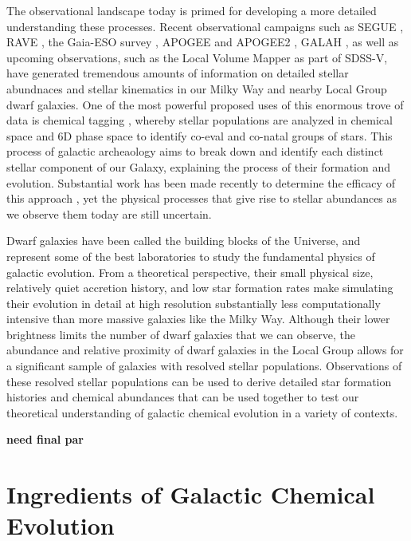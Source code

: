 The observational landscape today is primed for developing a more detailed understanding these processes. Recent observational campaigns such as SEGUE \citep{Yanny2009}, RAVE \citep{Kunder2017}, the Gaia-ESO survey \citep{Gaia}, APOGEE and APOGEE2 \citep{APOGEE2010,APOGEE}, GALAH \citep{GALAH,Buder2018}, as well as upcoming observations, such as the Local Volume Mapper as part of SDSS-V, have generated tremendous amounts of information on detailed stellar abundnaces and stellar kinematics in our Milky Way and nearby Local Group dwarf galaxies. One of the most powerful proposed uses of this enormous trove of data is chemical tagging \citep{Freeman2002}, whereby stellar populations are analyzed in chemical space and 6D phase space to identify co-eval and co-natal groups of stars. This process of galactic archeaology aims to break down and identify each distinct stellar component of our Galaxy, explaining the process of their formation and evolution. Substantial work has been made recently to determine the efficacy of this approach \citep[e.g.][]{Armillotta2018}, yet the physical processes that give rise to stellar abundances as we observe them today are still uncertain. 

Dwarf galaxies have been called the building blocks of the Universe, and represent some of the best laboratories to study the fundamental physics of galactic evolution. From a theoretical perspective, their small physical size, relatively quiet accretion history, and low star formation rates make simulating their evolution in detail at high resolution substantially less computationally intensive than more massive galaxies like the Milky Way. Although their lower brightness limits the number of dwarf galaxies that we can observe, the abundance and relative proximity of dwarf galaxies in the Local Group allows for a significant sample of galaxies with resolved stellar populations. Observations of these resolved stellar populations can be used to derive detailed star formation histories and chemical abundances that can be used together to test our theoretical understanding of galactic chemical evolution in a variety of contexts.

\textbf{need final par}

\section{Ingredients of Galactic Chemical Evolution}
\label{intro:sec:ingredients}

